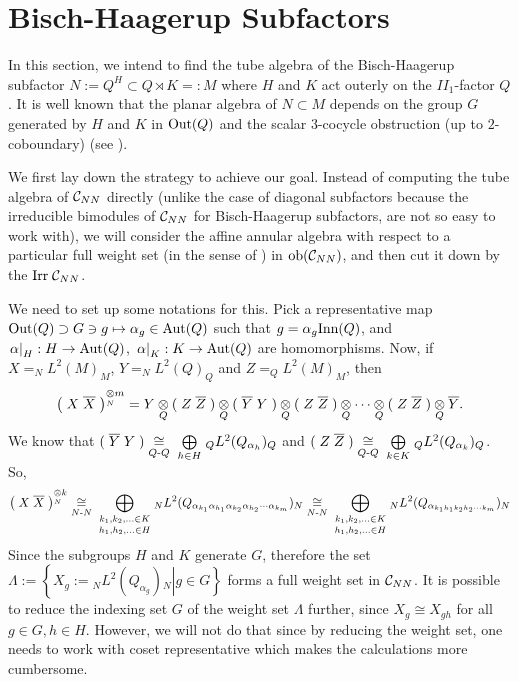 \section{Bisch-Haagerup Subfactors}
In this section, we intend to find the tube algebra of the Bisch-Haagerup subfactor $N:= Q^{H} \subset Q \rtimes K = : M$ where $ H $ and $ K $ act outerly  on the $II_1$-factor $Q$.
It is well known that the planar algebra of $ N \subset M $ depends on the group $ G $ generated by $ H $ and $ K $ in $ \text{Out} (Q) $ and the scalar $ 3 $-cocycle obstruction (up to $ 2 $-coboundary) (see \cite{BH, BDG1}).

We first lay down the strategy to achieve our goal.
Instead of computing the tube algebra of $ \mathcal C_{NN} $ directly (unlike the case of diagonal subfactors because the irreducible bimodules of $ \mathcal C_{NN} $ for Bisch-Haagerup subfactors, are not so easy to work with), we will consider the affine annular algebra with respect to a particular full weight set (in the sense of  \cite[Definition 3.4]{GJ}) in $\text{ob} (\mathcal C_{NN}) $, and then cut it down by the $ \text{Irr} \; \mathcal C_{NN} $.

We need to set up some notations for this.
Pick a representative map $ \text{Out} (Q) \supset G \ni g \mapsto \alpha_g \in \text{Aut} (Q) $ such that $ g = \alpha_g \text{Inn} (Q) $, and $ \left.\alpha\right|_H : H \rightarrow \text{Aut} (Q)$, $ \left.\alpha\right|_K : K \rightarrow \text{Aut} (Q) $ are homomorphisms.
Now, if $ X = _N L^2 (M)_M $, $ Y = _N L^2 (Q)_Q $ and  $ Z = _Q L^2 (M)_M $, then
\[
\left( \; X \; \overline{X} \; \right)^{\underset{N}{\otimes} m} = Y \underset{Q}{\otimes} ( \; Z \; \overline{Z} \; ) \underset{Q}{\otimes} ( \; \overline{Y} \; Y \; ) \underset{Q}{\otimes} ( \; Z \; \overline{Z} \; ) \underset{Q}{\otimes} \cdots \underset{Q}{\otimes} ( \; Z \; \overline{Z} \; ) \underset{Q}{\otimes} \overline{Y}.
\]
We know that $ ( \; \overline{Y} \; Y \; ) \underset{Q\text{-} Q }{\cong} \; \underset{h\in H}{\bigoplus} \; _Q  L^2 (Q_{\alpha_h})_Q$ and $ ( \; Z \; \overline{Z} \; ) \underset{Q\text{-} Q }{\cong} \; \underset{k\in K}{\bigoplus} \; _Q  L^2 (Q_{\alpha_k})_Q$.
So,
\[
\left( \; X \; \overline{X} \; \right)^{\underset{N}{\otimes} k} \underset{N\text{-} N }{\cong} \; \underset{h_1,h_2,\ldots \in H}{\underset{k_1,  k_2, \ldots \in K}{\bigoplus}} \; _N  L^2 (Q_{\alpha_{k_1} \alpha_{h_1} \alpha_{k_2} \alpha_{h_2} \cdots \alpha_{k_m}}) {} _N  \underset{N\text{-} N }{\cong} \; \underset{h_1,h_2,\ldots \in H}{\underset{k_1,  k_2, \ldots \in K}{\bigoplus}} \; _N  L^2 (Q_{\alpha_{k_1 h_1 k_2 h_2 \cdots k_m}}) {} _N
\]
Since the subgroups $ H $ and $ K $ generate $ G $, therefore the set $\Lambda:= \left\{\left. X_g := {}_N L^2 (Q_{\alpha_g} ) {}_N \right| g \in G\right\} $ forms a full weight set in $ \mathcal C_{NN} $.
It is possible to reduce the indexing set $ G $ of the weight set $ \Lambda $ further, since $ X_g \cong X_{gh} $ for all $ g \in G, h\in H $.
However, we will not do that since by reducing the weight set, one needs to work with coset representative which makes the calculations more cumbersome.

